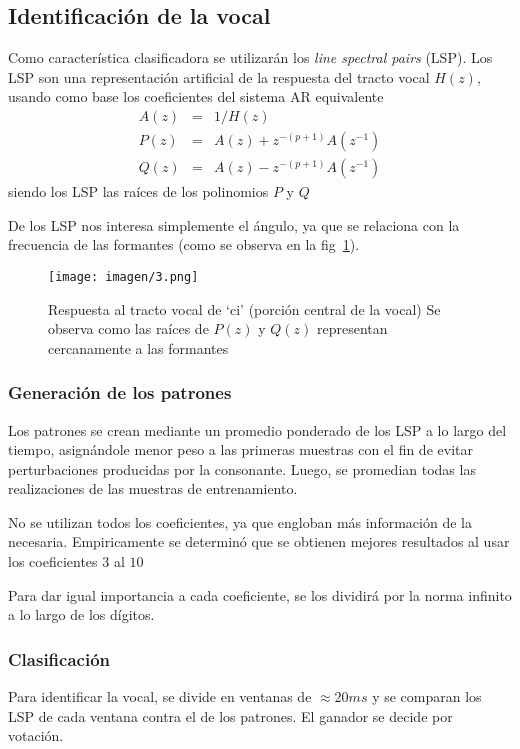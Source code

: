 \documentclass[conference,a4paper,10pt,oneside,final]{tfmpd}
\begin{document}
	\subsection{Identificación de la vocal}
		Como característica clasificadora se utilizarán los \emph{line spectral pairs} (LSP).
		Los LSP son una representación artificial de la respuesta del tracto vocal $H(z)$,
		usando como base los coeficientes del sistema AR equivalente
		\begin{eqnarray*}
			A(z) &=& 1/H(z) \\
			P(z) &=& A(z) + z^{-(p+1)}A(z^{-1}) \\
			Q(z) &=& A(z) - z^{-(p+1)}A(z^{-1})
		\end{eqnarray*}
		siendo los LSP las raíces de los polinomios $P$ y $Q$

		De los LSP nos interesa simplemente el ángulo, 
		ya que se relaciona con la frecuencia de las formantes 
		(como se observa en la fig~\ref{fig:tracto}).
		\begin{figure}
			\texttt{[image: imagen/3.png]}
			\caption{
				Respuesta al tracto vocal de `ci' (porción central de la vocal)
				Se observa como las raíces de $P(z)$ y $Q(z)$ representan cercanamente a las formantes
			}
			\label{fig:tracto}
		\end{figure}
		
		\subsubsection{Generación de los patrones}
		Los patrones se crean mediante un promedio ponderado de los LSP
		a lo largo del tiempo, asignándole menor peso a las primeras muestras
		con el fin de evitar perturbaciones producidas por la consonante.
		Luego, se promedian todas las realizaciones de las muestras de entrenamiento.

		No se utilizan todos los coeficientes,
		ya que engloban más información de la necesaria.
		Empiricamente se determinó que se obtienen mejores resultados 
		al usar los coeficientes $3$ al $10$

		Para dar igual importancia a cada coeficiente, se los dividirá por la norma infinito
		a lo largo de los dígitos.
			
		\subsubsection{Clasificación}
		Para identificar la vocal, se divide en ventanas de $\approx 20ms$ y se comparan los
		LSP de cada ventana contra el de los patrones.
		El ganador se decide por votación.
\end{document}
